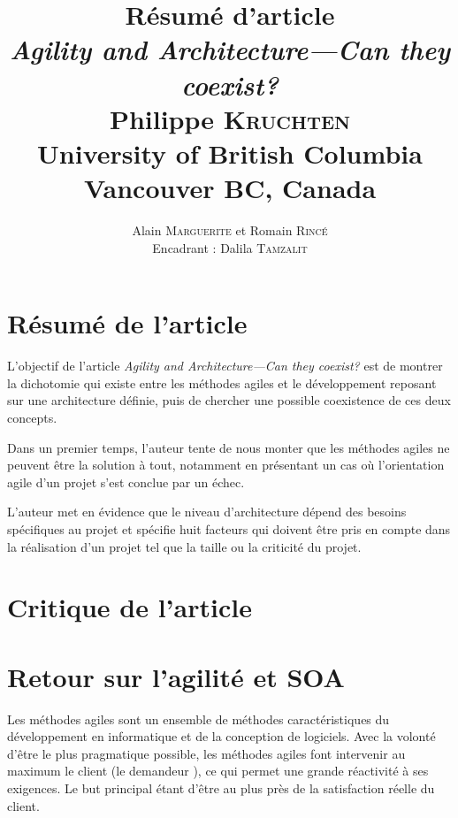 \documentclass[11pt,a4paper,utf8x]{article}
\title{{\large \textbf{Résumé d'article}\\\emph{Agility and Architecture—Can they coexist?}\\\vspace{1ex}
 {\scriptsize Philippe \textsc{Kruchten}\\\vspace{0.5ex}University of British Columbia\\\vspace{-4ex}
Vancouver BC, Canada}}}
\author{\small Alain \textsc{Marguerite} et Romain \textsc{Rincé}\\{\small Encadrant : Dalila \textsc{Tamzalit}}}
\date{}
\begin{document}
\maketitle
\renewcommand{\labelitemi}{$\bullet$} 


\section{Résumé de l'article}\label{sec:res}
L'objectif de l'article \emph{Agility and Architecture—Can they coexist?}  \cite{krutchen} est de montrer la dichotomie qui existe entre les méthodes agiles et le développement reposant sur une architecture définie, puis de chercher une possible coexistence de ces deux concepts. 

Dans un premier temps, l'auteur tente de nous monter que les méthodes agiles ne peuvent être la solution à tout, notamment en présentant un cas où l'orientation agile d'un projet s'est conclue par un échec. 

L'auteur met en évidence que le \og niveau\fg{} d'architecture dépend des besoins spécifiques au projet et spécifie huit facteurs qui doivent être pris en compte dans la réalisation d'un projet tel que la taille ou la criticité du projet.

\section{Critique de l'article}\label{sec:cri}


\section{Retour sur l'agilité et SOA}\label{sec:ret}
Les méthodes agiles sont un ensemble de méthodes caractéristiques du développement en informatique et de la conception de logiciels. Avec la volonté d'être le plus pragmatique possible, les méthodes agiles font intervenir au maximum le client (le \og demandeur \fg{}), ce qui permet une grande réactivité à ses exigences. Le but principal étant d'être au plus près de la satisfaction réelle du client.
\end{document}
